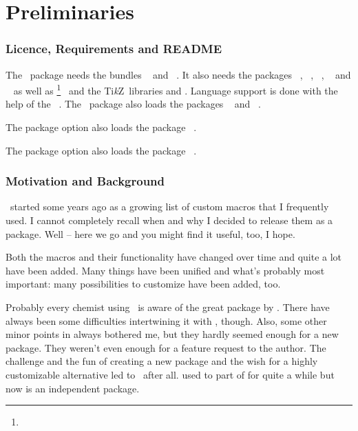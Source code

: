 \documentclass[load-preamble+]{cnltx-doc}
\newcommand*\TikZ{Ti\textit{k}Z}
\begin{document}
\part{Preliminaries}
\section{Licence, Requirements and \textsc{README}}\label{sec:licence-requ-readme}
\license

The \chemmacros\ package needs the bundles ~\cite{bnd:l3kernel}
and ~\cite{bnd:l3packages}.  It also needs the packages
~\cite{pkg:siunitx},
~\cite{pkg:mathtools}, ~\cite{pkg:bm},
~\cite{pkg:nicefrac} and
~\cite{pkg:environ} as well as
\footnote{}~\cite{pkg:pgf} and the \TikZ\
libraries  and .  Language support is done with the
help of the \needpackage{translations}~\cite{pkg:translations}.  The
\chemmacros\ package also loads the packages
~\cite{pkg:chemformula} and
~\cite{pkg:chemgreek}.

The package option  also loads the package
~\cite{pkg:xspace}.

The package option  also loads the package
~\cite{pkg:ghsystem}.


\section{Motivation and Background}\label{sec:motiv-backgr}
\chemmacros\ started some years ago as a growing list of custom macros that I
frequently used.  I cannot completely recall when and why I decided to release
them as a package.  Well -- here we go and you might find it useful, too, I
hope.

Both the macros and their functionality have changed over time and quite a lot
have been added.  Many things have been unified and what's probably most
important: many possibilities to customize have been added, too.

Probably every chemist using \LaTeXe\ is aware of the great 
package by \hensel.  There have always been some difficulties intertwining it
with \chemmacros, though.  Also, some other minor points in 
always bothered me, but they hardly seemed enough for a new package.  They
weren't even enough for a feature request to the \pkg{mhchem} author.  The
challenge and the fun of creating a new package and the wish for a highly
customizable alternative led to \chemformula\ after all.  \chemformula{} used
to part of \chemmacros{} for quite a while but now is an independent package.
\end{document}
